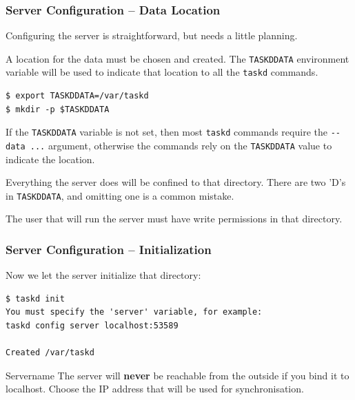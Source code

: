 \documentclass[t,handout]{beamer}
\begin{document}
\begin{frame}[fragile]\frametitle{Server Configuration -- Data Location}
    Configuring the server is straightforward, but needs a little planning.

    A location for the data must be chosen and created. The \verb+TASKDDATA+ environment variable will be used to indicate that location to all the \verb+taskd+ commands.

    \begin{lstlisting}
$ export TASKDDATA=/var/taskd
$ mkdir -p $TASKDDATA\end{lstlisting}

    If the \verb+TASKDDATA+ variable is not set, then most \verb+taskd+ commands require the \verb+--data ...+ argument, otherwise the commands rely on the \verb+TASKDDATA+ value to indicate the location.

        \begin{alertblock}{Everything the server does will be confined to that directory.}
        There are two 'D's in \verb+TASKDDATA+, and omitting one is a common mistake.

        The user that will run the server must have write permissions in that directory.
	\end{alertblock}
\end{frame}

\begin{frame}[fragile]\frametitle{Server Configuration -- Initialization}
    \vfill
    Now we let the server initialize that directory:

    \begin{lstlisting}
$ taskd init
You must specify the 'server' variable, for example:
taskd config server localhost:53589

Created /var/taskd\end{lstlisting}\pause

    \begin{alertblock}{Servername}
        The server will \textbf{never} be reachable from the outside if you bind it to localhost. Choose the IP address that will be used for synchronisation.
    \end{alertblock}
\end{frame}
\end{document}
